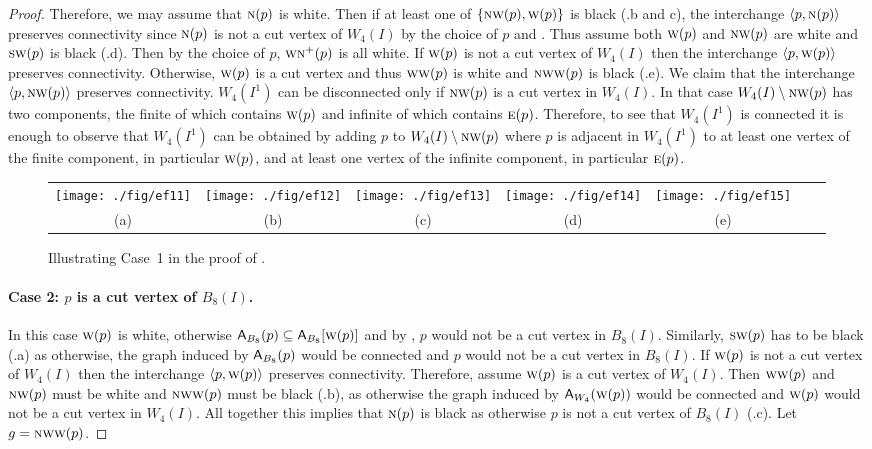 \documentclass[lotsofwhite,charterfonts]{patmorin}
\newcommand{\N}{\textsc{n}}
\newcommand{\E}{\textsc{e}}
\newcommand{\SW}{\textsc{sw}}
\newcommand{\W}{\textsc{w}}
\newcommand{\NW}{\textsc{nw}}
\newcommand{\ic}[2]{\langle #1,#2 \rangle}
\newcommand{\A}[2]{\ensuremath{\protect\textup{\textsf{A}}_{#2}(#1)}}
\newcommand{\AC}[2]{\ensuremath{\protect\textup{\textsf{A}}_{#2}[#1]}}
\newcommand{\sm}{\ensuremath{\setminus}}
\newcommand{\se}{\ensuremath{\subseteq}}
\begin{document}
\begin{proof}
Therefore, we may assume that $\N(p)$ is white. Then if at least one of $\{\NW(p), \W(p)\}$ is black (.b and c), the interchange $\ic{p}{\N(p)}$ preserves connectivity since $\N(p)$ is not a cut vertex of $W_4(I)$ by the choice of $p$ and . Thus assume both $\W(p)$ and $\NW(p)$ are white and $\SW(p)$ is black (.d). Then by the choice of $p$, $\W\N^+(p)$ is all white. If $\W(p)$ is not a cut vertex of $W_4(I)$ then  the interchange $\ic{p}{\W(p)}$ preserves connectivity. Otherwise,  $\W(p)$ is a cut vertex and thus $\W\W(p)$ is white and $\NW\W(p)$ is black (.e). We claim that the interchange $\ic{p}{\NW(p)}$ preserves connectivity.  $W_4(I^1)$ can be disconnected only if $\NW(p)$ is a cut vertex in $W_4(I)$.
 In that case  $W_4(I)\sm \NW(p)$ has two components, the finite of which contains $\W(p)$ and infinite of which contains $\E(p)$. Therefore, to see that $W_4(I^1)$ is connected it is enough to observe that $W_4(I^1)$ can be obtained by adding $p$ to $W_4(I)\sm \NW(p)$ where $p$ is adjacent in $W_4(I^1)$ to at least one vertex of the finite component, in particular $\W(p)$, and at least one vertex of the infinite component, in particular $\E(p)$.

\begin{figure}[htbp]
\begin{center}
\begin{tabular}{ccccccc}
\texttt{[image: ./fig/ef11]} & 
\texttt{[image: ./fig/ef12]} & 
\texttt{[image: ./fig/ef13]} & 
\texttt{[image: ./fig/ef14]} & 
\texttt{[image: ./fig/ef15]} 
\\
(a) & (b) & (c) & (d) & (e)
\end{tabular}
\end{center}
\caption{Illustrating Case~1 in the proof of .}
\end{figure}


\paragraph{Case 2: $p$ is a cut vertex of $B_8(I)$.} In this case $\W(p)$ is white, otherwise $\A{p}{B_8}\se \AC{\W(p)}{B_8}$ and by , $p$ would not be a cut vertex in $B_8(I)$. Similarly, $\SW(p)$ has to be black (.a) as otherwise, the graph induced by $\A{p}{B_8}$ would be connected and $p$ would not be a cut vertex in $B_8(I)$. If $\W(p)$ is not a cut vertex of $W_4(I)$ then  the interchange $\ic{p}{\W(p)}$ preserves connectivity. Therefore, assume $\W(p)$ is a cut vertex of $W_4(I)$. Then $\W\W(p)$ and $\NW(p)$ must be white and $\NW\W(p)$ must be black (.b), as otherwise the graph induced by $\A{\W(p)}{W_4}$ would be connected and $\W(p)$ would not be a cut vertex in $W_4(I)$. All together this implies that $\N(p)$ is black as otherwise $p$ is not a cut vertex of $B_8(I)$ (.c). Let $g=\NW\W(p)$.


\end{proof}
\end{document}
